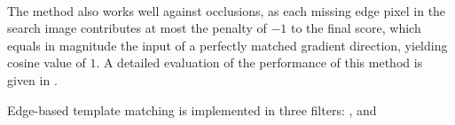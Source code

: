 \paragraph*{}
The method also works well against occlusions, as each missing edge pixel in the search image contributes at most the penalty of $-1$ to the final score, which equals in magnitude the input of a perfectly matched gradient direction, yielding cosine value of $1$. A detailed evaluation of the performance of this method is given in \cite{UlrichSteger02}.

\begin{refImpl}
Edge-based template matching is implemented in three \studio filters: ,  and 
\end{refImpl}